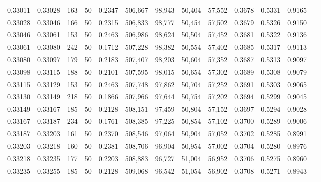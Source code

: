 \begin{tabular}{rrrrrrrrrrrrr}
0.33011 & 0.33028 &   163 &  50 &                                     0.2347 & 506,667 &  98,943 &  50,404 &  57,552 & 0.3678 & 0.5331 & 0.9165 \\
0.33028 & 0.33046 &   166 &  50 &                                     0.2315 & 506,833 &  98,777 &  50,454 &  57,502 & 0.3679 & 0.5326 & 0.9150 \\
0.33046 & 0.33061 &   153 &  50 &                                     0.2463 & 506,986 &  98,624 &  50,504 &  57,452 & 0.3681 & 0.5322 & 0.9136 \\
0.33061 & 0.33080 &   242 &  50 &                                     0.1712 & 507,228 &  98,382 &  50,554 &  57,402 & 0.3685 & 0.5317 & 0.9113 \\
0.33080 & 0.33097 &   179 &  50 &                                     0.2183 & 507,407 &  98,203 &  50,604 &  57,352 & 0.3687 & 0.5313 & 0.9097 \\
0.33098 & 0.33115 &   188 &  50 &                                     0.2101 & 507,595 &  98,015 &  50,654 &  57,302 & 0.3689 & 0.5308 & 0.9079 \\
0.33115 & 0.33129 &   153 &  50 &                                     0.2463 & 507,748 &  97,862 &  50,704 &  57,252 & 0.3691 & 0.5303 & 0.9065 \\
0.33130 & 0.33149 &   218 &  50 &                                     0.1866 & 507,966 &  97,644 &  50,754 &  57,202 & 0.3694 & 0.5299 & 0.9045 \\
0.33149 & 0.33167 &   185 &  50 &                                     0.2128 & 508,151 &  97,459 &  50,804 &  57,152 & 0.3697 & 0.5294 & 0.9028 \\
0.33167 & 0.33187 &   234 &  50 &                                     0.1761 & 508,385 &  97,225 &  50,854 &  57,102 & 0.3700 & 0.5289 & 0.9006 \\
0.33187 & 0.33203 &   161 &  50 &                                     0.2370 & 508,546 &  97,064 &  50,904 &  57,052 & 0.3702 & 0.5285 & 0.8991 \\
0.33203 & 0.33218 &   160 &  50 &                                     0.2381 & 508,706 &  96,904 &  50,954 &  57,002 & 0.3704 & 0.5280 & 0.8976 \\
0.33218 & 0.33235 &   177 &  50 &                                     0.2203 & 508,883 &  96,727 &  51,004 &  56,952 & 0.3706 & 0.5275 & 0.8960 \\
0.33235 & 0.33255 &   185 &  50 &                                     0.2128 & 509,068 &  96,542 &  51,054 &  56,902 & 0.3708 & 0.5271 & 0.8943 \\

\end{tabular}
